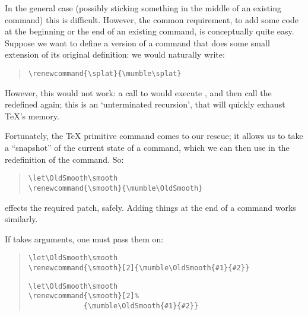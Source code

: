 In the general case (possibly sticking something in the middle of an
existing command) this is difficult.  However, the common requirement,
to add some code at the beginning or the end of an existing command,
is conceptually quite easy.  Suppose we want to define a version of a
command that does some small extension of its original definition: we
would naturally write:
\begin{quote}
\begin{verbatim}
\renewcommand{\splat}{\mumble\splat}
\end{verbatim}
\end{quote}
However, this would not work: a call to  would execute
, and then call the redefined  again; this is an
`unterminated recursion', that will quickly exhaust \TeX{}'s memory.

Fortunately, the \TeX{} primitive  command comes to our
rescue; it allows us to take a ``snapshot'' of the current state of a
command, which we can then use in the redefinition of the command.
So:
\begin{quote}
\begin{verbatim}
\let\OldSmooth\smooth
\renewcommand{\smooth}{\mumble\OldSmooth}
\end{verbatim}
\end{quote}
effects the required patch, safely.  Adding things at the end of a
command works similarly.

If  takes arguments, one must pass them on:
\begin{quote}
\begin{wideversion}
\begin{verbatim}
\let\OldSmooth\smooth
\renewcommand{\smooth}[2]{\mumble\OldSmooth{#1}{#2}}
\end{verbatim}
\end{wideversion}
\begin{narrowversion}
\begin{verbatim}
\let\OldSmooth\smooth
\renewcommand{\smooth}[2]%
             {\mumble\OldSmooth{#1}{#2}}
\end{verbatim}
\end{narrowversion}
\end{quote}

